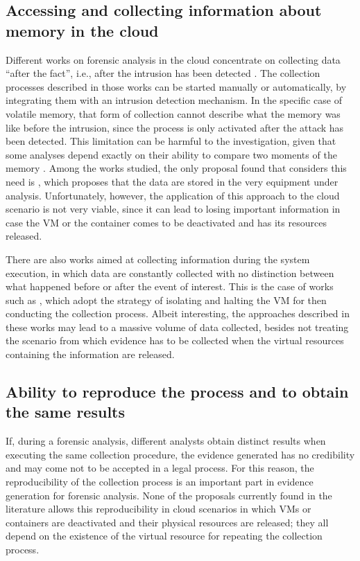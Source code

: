 \documentclass[conference]{IEEEtran}
\begin{document}
\subsection{Accessing and collecting information about memory in the cloud}

Different works on forensic analysis in the cloud concentrate on collecting data “after the fact”, i.e., after the intrusion has been detected \cite{Reichert_Auto_acquisition:2015,Poisel_VMI:2013,Dykstra_FROST:2013,George_DF2CE:2012,Sang_Log_approach:2013}. 
%
The collection processes described in those works can be started manually or automatically, by integrating them with an intrusion detection mechanism. 
%
In the specific case of volatile memory, that form of collection cannot describe what the memory was like before the intrusion, since the process is only activated after the attack has been detected. 
%
This limitation can be harmful to the investigation, given that some analyses depend exactly on their ability to compare two moments of the memory \cite{Case_Memory_Forensics:2014}. 
%
Among the works studied, the only proposal found that considers this need is \cite{Dezfouli_Backup_approach:2012}, which proposes that the data are stored in the very equipment under analysis.
%
Unfortunately, however, the application of this approach to the cloud scenario is not very viable, since it can lead to losing important information in case the VM or the container comes to be deactivated and has its resources released.
%

There are also works aimed at collecting information during the system execution, in which data are constantly collected with no distinction between what happened before or after the event of interest.
%
This is the case of works such as \cite{Poisel_VMI:2013,Dykstra_FROST:2013,Sang_Log_approach:2013}, which adopt the strategy of isolating and halting the VM for then conducting the collection process. 
%
Albeit interesting, the approaches described in these works may lead to a massive volume of data collected, besides not treating the scenario from which evidence has to be collected when the virtual resources containing the information are released.


\subsection{Ability to reproduce the process and to obtain the same results}

If, during a forensic analysis, different analysts obtain distinct results when executing the same collection procedure, the evidence generated has no credibility and may come not to be accepted in a legal process. 
%
For this reason, the reproducibility of the collection process is an important part in evidence generation for forensic analysis.
%
None of the proposals currently found in the literature allows this reproducibility in cloud scenarios in which VMs or containers are deactivated and their physical resources are released; they all depend on the existence of the virtual resource for repeating the collection process.
\end{document}
